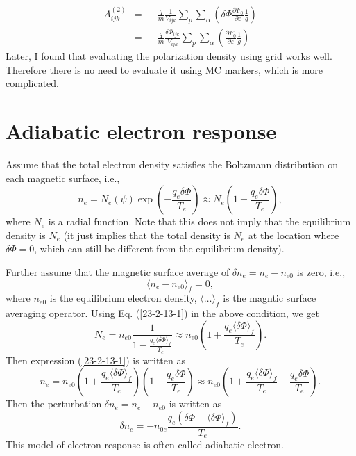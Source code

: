 \documentclass{llncs}
\begin{document}
\begin{eqnarray*}
  A_{i j k}^{(2)} & = & - \frac{q}{m} \frac{1}{V_{i j k}} \sum_p \sum_{\alpha}
  \left( \delta \Phi \frac{\partial F_0}{\partial \varepsilon} \frac{1}{g}
  \right)\\
  & = & - \frac{q}{m} \frac{\delta \Phi_{i j k}}{V_{i j k}} \sum_p
  \sum_{\alpha} \left( \frac{\partial F_0}{\partial \varepsilon} \frac{1}{g}
  \right)
\end{eqnarray*}
Later, I found that evaluating the polarization density using grid works well.
Therefore there is no need to evaluate it using MC markers, which is more
complicated.

\appendix\section{Adiabatic electron response}

Assume that the total electron density satisfies the Boltzmann distribution on
each magnetic surface, i.e.,
\begin{equation}
  \label{23-2-13-1} n_e = N_e (\psi) \exp \left( - \frac{q_e \delta \Phi}{T_e}
  \right) \approx N_e \left( 1 - \frac{q_e \delta \Phi}{T_e} \right),
\end{equation}
where $N_e$ is a radial function. Note that this does not imply that the
equilibrium density is $N_e$ (it just implies that the total density is $N_e$
at the location where $\delta \Phi = 0$, which can still be different from the
equilibrium density).

Further assume that the magnetic surface average of $\delta n_e = n_e - n_{e
0}$ is zero, i.e.,
\begin{equation}
  \langle n_e - n_{e 0} \rangle_f = 0,
\end{equation}
where $n_{e 0}$ is the equilibrium electron density, $\langle \ldots
\rangle_f$ is the magntic surface averaging operator. Using Eq.
(\ref{23-2-13-1}) in the above condition, we get
\begin{equation}
  N_e = n_{e 0} \frac{1}{1 - \frac{q_e \langle \delta \Phi \rangle_f}{T_e}}
  \approx n_{e 0} \left( 1 + \frac{q_e \langle \delta \Phi \rangle_f}{T_e}
  \right) .
\end{equation}
Then expression (\ref{23-2-13-1}) is written as
\begin{equation}
  n_e = n_{e 0} \left( 1 + \frac{q_e \langle \delta \Phi \rangle_f}{T_e}
  \right) \left( 1 - \frac{q_e \delta \Phi}{T_e} \right) \approx n_{e 0}
  \left( 1 + \frac{q_e \langle \delta \Phi \rangle_f}{T_e} - \frac{q_e \delta
  \Phi}{T_e} \right) .
\end{equation}
Then the perturbation $\delta n_e = n_e - n_{e 0}$ is written as
\begin{equation}
  \label{23-3-10-1} \delta n_e = - n_{0 e} \frac{q_e (\delta \Phi - \langle
  \delta \Phi \rangle_f)}{T_e} .
\end{equation}
This model of electron response is often called adiabatic electron.
\end{document}
